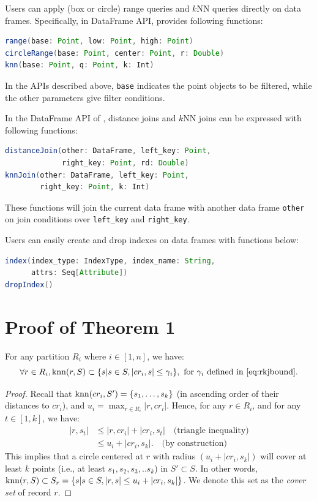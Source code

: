 \begin{appendix}
 Users can apply (box or circle) range queries
and $k$NN queries directly on data frames. Specifically, in DataFrame API, \name provides
following functions:
\begin{lstlisting}[language=java]
range(base: Point, low: Point, high: Point)
circleRange(base: Point, center: Point, r: Double)
knn(base: Point, q: Point, k: Int)
\end{lstlisting}
In the APIs described above, \texttt{base} indicates the point objects to be filtered,
while the other parameters give filter conditions.

 In the DataFrame API of \name, distance joins
and $k$NN joins can be expressed with following functions:
\begin{lstlisting}[language=java]
distanceJoin(other: DataFrame, left_key: Point,
             right_key: Point, rd: Double)
knnJoin(other: DataFrame, left_key: Point,
        right_key: Point, k: Int)
\end{lstlisting}
These functions will join the current data frame with another data frame \texttt{other}
on join conditions over \texttt{left\_key} and \texttt{right\_key}.

 Users can easily create and drop indexes on data
frames with functions below:
\begin{lstlisting}[language=java]
index(index_type: IndexType, index_name: String, 
      attrs: Seq[Attribute])
dropIndex()
\end{lstlisting}

\setcounter{theorem}{0}
\section{Proof of Theorem 1}
\label{sec:proof1}
\begin{theorem}
For any partition $R_i$ where $i \in[1, n]$, we have:
\[\forall r \in R_i, \operatorname{knn}(r, S) \subset \{s|s \in S, |cr_i, s| \leq
\gamma_i\}, \textrm{ for }\gamma_i \textrm{ defined in
}\eqref{eq:rkjbound}.\]
\end{theorem}
\begin{proof}
Recall that $\operatorname{knn}(cr_i, S')=\{s_1, \ldots, s_k\}$ (in ascending
order of their distances to $cr_i$), and $u_i=\max_{r\in R_i}|r,
cr_i|$. Hence, for any $r \in R_i$, and for any $t \in [1, k]$, we
have:
\begin{align*}
|r, s_t|& \leq |r, cr_i| + |cr_i, s_t| \quad \textrm{(triangle inequality)}\\
   &\leq u_i + |cr_i, s_k|. \quad \textrm{(by construction)}
\end{align*}
This implies that a circle centered at $r$ with radius $(u_i + |cr_i,
s_k|)$ will cover at least $k$ points (i.e., at least $s_1, s_2, s_3,
.. s_k$) in $S'\subset S$. In other words, $\operatorname{knn}(r, S) \subset
S_r=\{s|s \in S, |r, s| \leq u_i + |cr_i, s_k|\}$. We denote this set
as the {\em cover set} of record $r$.


\end{proof}
\end{appendix}
